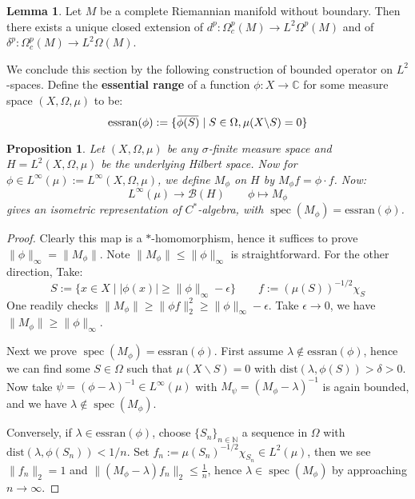 \documentclass[11pt]{report}
\theoremstyle{definition}
\newtheorem{Lemma}[Def]{Lemma}
\theoremstyle{plain}
\newtheorem{Prop}[Def]{Proposition}
\DeclareMathOperator{\spec}{spec}
\newcommand{\nat}{\mathbb{N}}
\newcommand{\complex}{\mathbb{C}}
\newcommand{\overbar}[1]{\mkern 1.5mu\overline{\mkern-1.5mu#1\mkern-1.5mu}\mkern 1.5mu}
\renewcommand{\bar}{\overbar}
\newcommand{\norm}[1]{\lVert #1 \rVert}
\begin{document}
\begin{Lemma}\label{unique closed extension}
	\cite{lesch1992} Let $M$ be a complete Riemannian manifold without boundary. Then there exists a unique closed extension of $d^p:\Omega^p_c(M)\to L^2\Omega^p(M)$ and of $\delta^p:\Omega^p_c(M)\to L^2\Omega(M)$.
\end{Lemma}
We conclude this section by the following construction of bounded operator on $L^2$-spaces. Define the \textbf{essential range} of a function $\phi:X\to \complex$ for some measure space $(X, \Omega, \mu)$ to be:
\begin{equation}
\mathrm{essran}(\phi):=\{\bar{\phi(S)}\mid S\in \Omega, \mu(X\backslash S)=0 \}
\end{equation}
\begin{Prop}\label{conix.2.6}
	Let $(X, \Omega, \mu)$ be any $\sigma$-finite measure space and $H=L^2(X, \Omega, \mu)$ be the underlying Hilbert space. Now for $\phi\in L^\infty(\mu):= L^\infty(X, \Omega, \mu)$, we define $M_\phi$ on $H$ by $M_\phi f=\phi\cdot f$. Now:
	\begin{equation}
	L^\infty(\mu)\to \mathcal{B}(H) \qquad \phi\mapsto M_\phi
	\end{equation}
	gives an isometric representation of $C^*$-algebra, with $\spec(M_\phi)=\mathrm{essran}(\phi)$.
\end{Prop}
\begin{proof}
	Clearly this map is a $*$-homomorphism, hence it suffices to prove $\norm{\phi}_\infty=\norm{M_\phi}$. Note $\norm{M_\phi}\leq \norm{\phi}_\infty$ is straightforward. For the other direction, Take:
	\begin{equation*}
	S:=\{x\in X\mid |\phi(x)|\geq \norm{\phi}_\infty-\epsilon\}\qquad f:=(\mu(S))^{-1/2}\chi_S
	\end{equation*}
	One readily checks $\norm{M_\phi}\geq \norm{\phi f}_2^2\geq \norm{\phi}_\infty-\epsilon$. Take $\epsilon\to 0$, we have $\norm{M_\phi}\geq \norm{\phi}_\infty$.
	\par Next we prove $\spec(M_\phi)=\mathrm{essran}(\phi)$. First assume $\lambda\notin \mathrm{essran}(\phi)$, hence we can find some $S\in \Omega$ such that $\mu(X\backslash  S)=0$ with $\mathrm{dist}(\lambda, \phi(S))>\delta>0$. Now take $\psi=(\phi-\lambda)^{-1}\in L^\infty(\mu)$ with $M_\psi=(M_\phi-\lambda)^{-1}$ is again bounded, and we have $\lambda\notin \spec(M_\phi)$.
	\par Conversely, if $\lambda\in \mathrm{essran}(\phi)$, choose $\{S_n\}_{n\in \nat}$ a sequence in $\Omega$ with $\mathrm{dist}(\lambda, \phi(S_n))<1/n$. Set $f_n:=\mu(S_n)^{-1/2}\chi_{S_n}\in L^2(\mu)$, then we see $\norm{f_n}_2=1$ and $\norm{(M_\phi-\lambda)f_n}_2\leq \frac{1}{n}$, hence $\lambda\in \spec(M_\phi)$ by approaching $n\to \infty$.
\end{proof}
\end{document}
